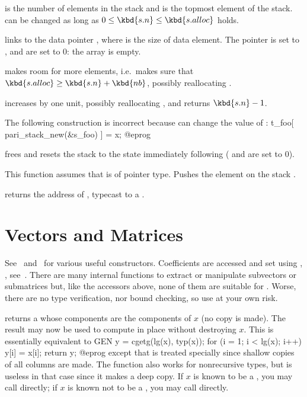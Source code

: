 \item {} is the number of elements in the stack and  is
the topmost element of the stack.   can be changed as long as
$0\leq\kbd{s.n}\leq\kbd{s.alloc}$ holds.

 links
 to the data pointer , where  is the size of
data element. The pointer  is set to ,  and
 are set to $0$: the array is empty.

 makes room for 
more elements, i.e.~makes sure that $\kbd{s.alloc}\geq\kbd{s.n} + \kbd{nb}$,
possibly reallocating .

 increases  by one unit,
possibly reallocating , and returns $\kbd{s.n}-1$.

 The following construction is incorrect because
 can change the value of :
\bprog
t_foo[ pari_stack_new(&s_foo) ] = x;
@eprog

 frees  and resets the
stack to the state immediately following  ( and
 are set to $0$).

 This function assumes
that  is of pointer type. Pushes the element  on the stack
.

 returns the address of ,
typecast to a .

\section{Vectors and Matrices}

See~ and~ for various useful constructors.
Coefficients are accessed and set using , ,
see~. There are many internal functions to extract or
manipulate subvectors or submatrices but, like the accessors above, none of
them are suitable for . Worse, there are no type
verification, nor bound checking, so use at your own risk.

 returns a  whose components are the
components of $x$ (no copy is made). The result may now be used to compute in
place without destroying $x$. This is essentially equivalent to
\bprog
  GEN y = cgetg(lg(x), typ(x));
  for (i = 1; i < lg(x); i++) y[i] = x[i];
  return y;
@eprog\noindent
except that  is treated specially since shallow copies of all columns
are made. The function also works for nonrecursive types, but is useless
in that case since it makes a deep copy. If $x$ is known to be a , you
may call  directly; if $x$ is known not to be a ,
you may call  directly.

